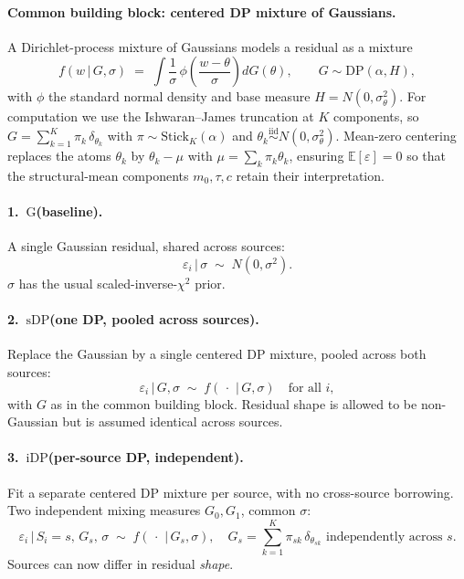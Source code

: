 \documentclass[11pt]{article}
\theoremstyle{plain}
\theoremstyle{definition}
\theoremstyle{remark}
\newcommand{\E}{\mathbb{E}}
\newcommand{\1}{\mathds{1}}
\newcommand{\given}{\,|\,}
\newcommand{\mGauss}{\ensuremath{\mathrm{G}}}
\newcommand{\mShDP}{\ensuremath{\mathrm{sDP}}}
\newcommand{\miDP}{\ensuremath{\mathrm{iDP}}}
\begin{document}
\paragraph{Common building block: centered DP mixture of Gaussians.}
A Dirichlet-process mixture of Gaussians \citep{escobar1995bayesian}
models a residual as a mixture
\[
  f(w \given G, \sigma) \;=\; \int \frac{1}{\sigma}\, \phi\!\left(\frac{w - \theta}{\sigma}\right) dG(\theta),
\qquad
  G \sim \mathrm{DP}(\alpha, H),
\]
with $\phi$ the standard normal density and base measure
$H = N(0, \sigma_\theta^2)$. For computation we use the
Ishwaran--James truncation \citep{ishwaran2001gibbs} at $K$
components, so $G = \sum_{k=1}^K \pi_k\, \delta_{\theta_k}$ with
$\pi \sim \mathrm{Stick}_K(\alpha)$ and
$\theta_k \stackrel{\mathrm{iid}}{\sim} N(0, \sigma_\theta^2)$.
Mean-zero centering \citep{yang2010semiparametric} replaces the atoms
$\theta_k$ by $\theta_k - \mu$ with
$\mu = \sum_k \pi_k \theta_k$, ensuring
$\E[\varepsilon] = 0$ so that the structural-mean components
$m_0, \tau, c$ retain their interpretation.

\paragraph{1.\ \mGauss (baseline).}
A single Gaussian residual, shared across sources:
\[
  \varepsilon_i \given \sigma \;\sim\; N(0, \sigma^2).
\]
$\sigma$ has the usual scaled-inverse-$\chi^2$ prior.

\paragraph{2.\ \mShDP (one DP, pooled across sources).}
Replace the Gaussian by a single centered DP mixture, pooled across
both sources:
\[
  \varepsilon_i \given G, \sigma \;\sim\; f(\,\cdot\, \given G, \sigma)
  \quad\text{for all }i,
\]
with $G$ as in the common building block. Residual shape is allowed
to be non-Gaussian but is assumed identical across sources.

\paragraph{3.\ \miDP (per-source DP, independent).}
Fit a separate centered DP mixture per source, with no cross-source
borrowing. Two independent mixing measures $G_0, G_1$, common
$\sigma$:
\[
  \varepsilon_i \given S_i = s,\, G_s,\, \sigma \;\sim\;
   f(\,\cdot\, \given G_s, \sigma),
\quad
   G_s = \sum_{k=1}^K \pi_{sk}\, \delta_{\theta_{sk}}
   \text{ independently across } s.
\]
Sources can now differ in residual \emph{shape}.
\end{document}
